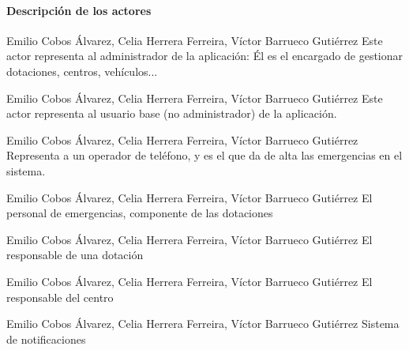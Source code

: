 \paragraph{Descripción de los actores}

{Emilio Cobos Álvarez, Celia Herrera Ferreira, Víctor Barrueco Gutiérrez}
{}
{Este actor representa al administrador de la aplicación: Él es el encargado de gestionar dotaciones, centros, vehículos...}

{Emilio Cobos Álvarez, Celia Herrera Ferreira, Víctor Barrueco Gutiérrez}
{}
{Este actor representa al usuario base (no administrador) de la aplicación.}

{Emilio Cobos Álvarez, Celia Herrera Ferreira, Víctor Barrueco Gutiérrez}
{}
{Representa a un operador de teléfono, y es el que da de alta las emergencias en el sistema.}

{Emilio Cobos Álvarez, Celia Herrera Ferreira, Víctor Barrueco Gutiérrez}
{}
{El personal de emergencias, componente de las dotaciones}

{Emilio Cobos Álvarez, Celia Herrera Ferreira, Víctor Barrueco Gutiérrez}
{}
{El responsable de una dotación}

{Emilio Cobos Álvarez, Celia Herrera Ferreira, Víctor Barrueco Gutiérrez}
{}
{El responsable del centro}

{Emilio Cobos Álvarez, Celia Herrera Ferreira, Víctor Barrueco Gutiérrez}
{}
{Sistema de notificaciones}

